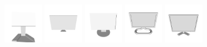 \begin{figure}[!hbt]
	\includegraphics[width=0.15\textwidth]{Figures/ObjRecog/monitor_0}\hfill
	\includegraphics[width=0.15\textwidth]{Figures/ObjRecog/monitor_1}\hfill
	\includegraphics[width=0.15\textwidth]{Figures/ObjRecog/monitor_2}\hfill
	\includegraphics[width=0.15\textwidth]{Figures/ObjRecog/monitor_3}\hfill
	\includegraphics[width=0.15\textwidth]{Figures/ObjRecog/monitor_4}\hfill


\end{figure}
